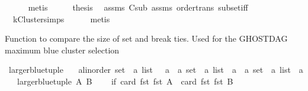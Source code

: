 \begin{isabellebody}
\ \ \ \ \isamarkupfalse%
\ metis\isanewline
\ \ \isamarkupfalse%
\ \isamarkupfalse%
\ {\isacharquery}{\kern0pt}thesis\ \isamarkupfalse%
\ assms{\isacharparenleft}{\kern0pt}{}{\isacharparenright}{\kern0pt}\ C{\isacharprime}{\kern0pt}{\isacharunderscore}{\kern0pt}sub\ assms{\isacharparenleft}{\kern0pt}{}{\isacharparenright}{\kern0pt}\ order{\isachardot}{\kern0pt}trans\ subset{\isacharunderscore}{\kern0pt}iff\isanewline
\ \ \ \ \isamarkupfalse%
\ \ kCluster{\isachardot}{\kern0pt}simps\isanewline
\ \ \ \ \isamarkupfalse%
\ metis\ \ \ \isanewline
{}\isamarkupfalse%
%
\endisatagproof
{\isafoldproof}%
%
\isadelimproof
%
\endisadelimproof
%
\begin{isamarkuptext}%
Function to compare the size of set and break ties. Used for the GHOSTDAG maximum blue 
      cluster selection%
\end{isamarkuptext}\isamarkuptrue%
\isamarkupfalse%
\ larger{\isacharunderscore}{\kern0pt}blue{\isacharunderscore}{\kern0pt}tuple\ {\isacharcolon}{\kern0pt}{\isacharcolon}{\kern0pt}\isanewline
\ \ {\isachardoublequoteopen}{\isacharparenleft}{\kern0pt}{\isacharparenleft}{\kern0pt}{\isacharprime}{\kern0pt}a{\isacharcolon}{\kern0pt}{\isacharcolon}{\kern0pt}linorder\ set\ {\isasymtimes}\ {\isacharprime}{\kern0pt}a\ list{\isacharparenright}{\kern0pt}\ \ {\isasymtimes}\ {\isacharprime}{\kern0pt}a{\isacharparenright}{\kern0pt}\ {\isasymRightarrow}\ {\isacharparenleft}{\kern0pt}{\isacharparenleft}{\kern0pt}{\isacharprime}{\kern0pt}a\ set\ {\isasymtimes}\ {\isacharprime}{\kern0pt}a\ list{\isacharparenright}{\kern0pt}\ {\isasymtimes}\ {\isacharprime}{\kern0pt}a{\isacharparenright}{\kern0pt}\ {\isasymRightarrow}\ {\isacharparenleft}{\kern0pt}{\isacharparenleft}{\kern0pt}{\isacharprime}{\kern0pt}a\ set\ {\isasymtimes}\ {\isacharprime}{\kern0pt}a\ list{\isacharparenright}{\kern0pt}\ {\isasymtimes}\ {\isacharprime}{\kern0pt}a{\isacharparenright}{\kern0pt}{\isachardoublequoteclose}\isanewline
\ \ \ {\isachardoublequoteopen}larger{\isacharunderscore}{\kern0pt}blue{\isacharunderscore}{\kern0pt}tuple\ A\ B\ {\isacharequal}{\kern0pt}\ \isanewline
\ \ {\isacharparenleft}{\kern0pt}if\ {\isacharparenleft}{\kern0pt}card\ {\isacharparenleft}{\kern0pt}fst\ {\isacharparenleft}{\kern0pt}fst\ A{\isacharparenright}{\kern0pt}{\isacharparenright}{\kern0pt}{\isacharparenright}{\kern0pt}\ {\isachargreater}{\kern0pt}\ {\isacharparenleft}{\kern0pt}card\ {\isacharparenleft}{\kern0pt}fst\ {\isacharparenleft}{\kern0pt}fst\ B{\isacharparenright}{\kern0pt}{\isacharparenright}{\kern0pt}{\isacharparenright}{\kern0pt}\ {\isasymor}\ \isanewline

\end{isabellebody}
